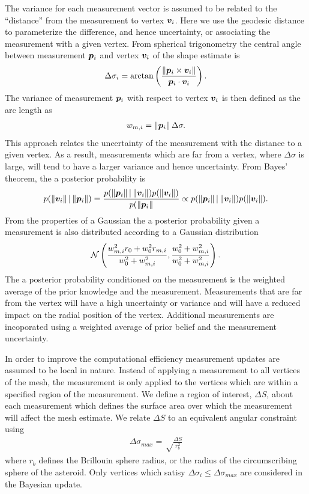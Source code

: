 \documentclass[letterpaper, paper,11pt]{AAS}		%
\begin{document}
The variance for each measurement vector is assumed to be related to the ``distance'' from the measurement to vertex \( \bm{v}_i \).
Here we use the geodesic distance to parameterize the difference, and hence  uncertainty, or associating the measurement with a given vertex.
From spherical trigonometry the central angle between measurement \( \bm{p}_i \) and vertex \( \bm{v}_i \) of the shape estimate is
\begin{align}
    \Delta \sigma_i = \arctan \left( \frac{\left\| \bm{p}_i \times \bm{v}_i \right\|}{\bm{p}_i \cdot \bm{v}_i } \right).
\end{align}
The variance of measurement \( \bm{p}_i \) with respect to vertex \( \bm{v}_i \) is then defined as the arc length as
\begin{align}
    w_{m, i} = \left\| \bm{p}_i \right\| \Delta \sigma .
\end{align}
This approach relates the uncertainty of the measurement with the distance to a given vertex.
As a result, measurements which are far from a vertex, where \( \Delta \sigma \) is large, will tend to have a larger variance and hence uncertainty. 
From Bayes' theorem, the a posterior probability is
\begin{align}
    p(\left\| \bm{v}_i \right\| | \left\| \bm{p}_i \right\|) = \frac{p(\left\| \bm{p}_i \right\| | \left\| \bm{v}_i \right\|) p(\left\| \bm{v}_i \right\|)}{p(\left\| \bm{p}_i \right\|} \propto p(\left\| \bm{p}_i \right\| | \left\| \bm{v}_i \right\|) p(\left\| \bm{v}_i \right\|).
\end{align}
From the properties of a Gaussian the a posterior probability given a measurement is also distributed according to a Gaussian distribution
\begin{align}
    \mathcal{N} \left( \frac{w_{m, i}^2 r_0 + w_0^2 r_{m, i}}{w_0^2 + w_{m, i}^2} , \frac{w_0^2 + w_{m, i}^2}{w_0^2 + w_{m, i}^2} \right) .
\end{align}
The a posterior probability conditioned on the measurement is the weighted average of the prior knowledge and the measurement. 
Measurements that are far from the vertex will have a high uncertainty or variance and will have a reduced impact on the radial position of the vertex.
Additional measurements are incoporated using a weighted average of prior belief and the measurement uncertainty.

In order to improve the computational efficiency measurement updates are assumed to be local in nature.
Instead of applying a measurement to all vertices of the mesh, the measurement is only applied to the vertices which are within a specified region of the measurement. 
We define a region of interest, \( \Delta S \), about each measurement which defines the surface area over which the measurement will affect the mesh estimate.
We relate \( \Delta S \) to an equivalent angular constraint using
\begin{align}
    \Delta \sigma_{max} = \sqrt \frac{\Delta S}{r_b^2}
\end{align}
where \( r_b \) defines the Brillouin  sphere radius, or the radius of the circumscribing sphere of the asteroid.
Only vertices which satisy \( \Delta \sigma_i \leq \Delta \sigma_{max} \) are considered in the Bayesian update.
\end{document}
